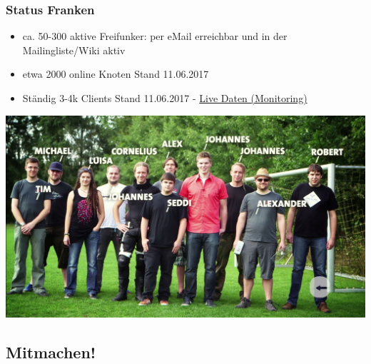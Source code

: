 \begin{frame}
\begin{columns}[c]
\begin{column}[T]{0.4\textwidth}
		\end{column}
	\end{columns}		

\end{frame}

\begin{frame}
\frametitle{Status Franken}
	\begin{itemize}
		\item ca. 50-300 aktive Freifunker: per eMail erreichbar und in der Mailingliste/Wiki aktiv
		\item etwa 2000 online Knoten
			\begingroup 
				\tiny{Stand 11.06.2017}
			\endgroup
		\item Ständig 3-4k Clients  
			\begingroup 
				\tiny{Stand 11.06.2017 - \href{https://monitoring.freifunk-franken.de/statistics}{Live Daten (Monitoring)}}
			\endgroup
	\end{itemize}
	\includegraphics[width=\textwidth]{images/community.jpg}
\end{frame}

\subsection{Mitmachen!}

